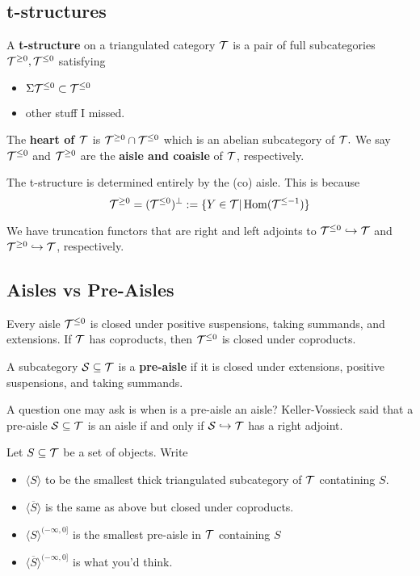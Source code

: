 \documentclass[12pt]{article}
\begin{document}
\subsection{t-structures}
\begin{defn}
	A \textbf{t-structure} on a triangulated category $\mathcal{T}$ is a pair of full subcategories $\mathcal{T}^{\ge 0},\mathcal{T}^{\le 0}$ satisfying 
	\begin{itemize}
		\item $\Sigma\mathcal{T}^{\le 0}\subset \mathcal{T}^{\le 0}$
		\item other stuff I missed.
	\end{itemize}
\end{defn}

The \textbf{heart of $\mathcal{T}$} is $\mathcal{T}^{\ge 0}\cap\mathcal{T}^{\le 0}$ which 
is an abelian subcategory of $\mathcal{T}.$ We say $\mathcal{T}^{\le 0}$ and $\mathcal{T}^{\ge 0}$ are the \textbf{aisle and coaisle} of $\mathcal{T}$,
respectively.
\begin{rmk}
	The t-structure is determined entirely by the (co) aisle. This is because
	\[\mathcal{T}^{\ge 0}=(\mathcal{T}^{\le 0})^\perp:=\{Y\in\mathcal{T}|\operatorname{Hom}(\mathcal{T}^{\le -1})\}\]
\end{rmk}

We have truncation functors that are right and left adjoints to $\mathcal{T}^{\le 0}\hookrightarrow\mathcal{T}$ and $\mathcal{T}^{\ge 0}\hookrightarrow\mathcal{T}$, respectively.

\subsection{Aisles vs Pre-Aisles}
Every aisle $\mathcal{T}^{\le 0}$ is closed under positive suspensions, taking summands, and extensions. If $\mathcal{T}$ has coproducts, then $\mathcal{T}^{\le 0}$ is closed under coproducts.
\begin{defn}
	A subcategory $\mathcal{S}\subseteq\mathcal{T}$ is a \textbf{pre-aisle} if it is closed under extensions, positive suspensions, and taking summands.
\end{defn}

A question one may ask is when is a pre-aisle an aisle? Keller-Vossieck said that a pre-aisle $\mathcal{S}\subseteq \mathcal{T}$ is an aisle if and only if $\mathcal{S}\hookrightarrow\mathcal{T}$
has a right adjoint.

Let $S\subseteq\mathcal{T}$ be a set of objects. Write 
\begin{itemize}
	\item $\langle S\rangle$ to be the smallest thick triangulated subcategory of $\mathcal{T}$ contatining $S$.
	\item $\langle\overline{S}\rangle$ is the same as above but closed under coproducts.
	\item $\langle S\rangle^{(-\infty,0]}$ is the smallest pre-aisle in $\mathcal{T}$ containing $S$
	\item $\langle\overline{S}\rangle^{(-\infty,0]}$ is what you'd think.
\end{itemize}
\end{document}
